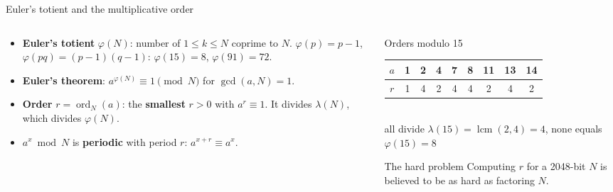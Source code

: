 \documentclass[aspectratio=169,11pt]{beamer}
\newcommand{\hl}[1]{{\color{qorange}\textbf{#1}}}
\newcommand{\key}[1]{{\color{qdark}\textbf{#1}}}
\begin{document}
\begin{frame}[label=fTotient]{Euler's totient and the multiplicative order}
  \begin{columns}[T]
    \begin{column}{0.52\textwidth}
      \small
      \begin{itemize}\itemsep1pt
        \item \key{Euler's totient} $\varphi(N)$: number of $1 \le k \le N$ coprime to $N$. $\varphi(p) = p - 1$, $\varphi(pq) = (p - 1)(q - 1)$: $\varphi(15) = 8$, $\varphi(91) = 72$.
        \item \key{Euler's theorem}: $a^{\varphi(N)} \equiv 1 \pmod N$ for $\gcd(a, N) = 1$.
        \item \key{Order} $r = \operatorname{ord}_N(a)$: the \hl{smallest} $r > 0$ with $a^r \equiv 1$. It divides $\lambda(N)$, which divides $\varphi(N)$.
        \item $a^x \bmod N$ is \key{periodic} with period $r$: $a^{x + r} \equiv a^x$.
      \end{itemize}
    \end{column}
    \begin{column}{0.44\textwidth}
      \begin{exampleblock}{Orders modulo 15}
        \scriptsize
        \begin{tabular}{c|cccccccc}
          $a$ & 1 & 2 & 4 & 7 & 8 & 11 & 13 & 14\\ \hline
          $r$ & 1 & 4 & 2 & 4 & 4 & 2 & 4 & 2
        \end{tabular}\\[3pt]
        all divide $\lambda(15) = \operatorname{lcm}(2, 4) = 4$, none equals $\varphi(15) = 8$
      \end{exampleblock}
      \begin{alertblock}{The hard problem}
        \small Computing $r$ for a 2048-bit $N$ is believed to be as hard as factoring $N$.
      \end{alertblock}
    \end{column}
  \end{columns}
\end{frame}
\end{document}
